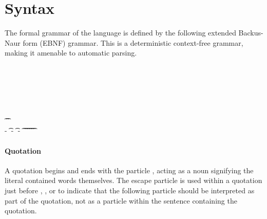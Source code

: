 \section{Syntax} \label{sec:syntax}

The formal grammar of the language is defined by the following extended
Backus-Naur form (EBNF) grammar. This is a deterministic context-free grammar,
making it amenable to automatic parsing.

\begin{ebnf}
	 \is {} 
	\\
	 \is {} 
	\altLine {}  
	\altLine {}  
	\\
	 \is {}
	\altLine {}
	\altLine {}
	\altLine {}
	\altLine {}  
	\\
	 \is {}  
	\\
	 \is {} \alt {}
	\altLine {}  
	\\
	 \is \t{}  \t{}
	\\
	 \is {} - \t{} - \t{} - \t{}
	\altLine \t{} \t{}
	\altLine \t{} \t{}
	\altLine \t{} \t{}
\end{ebnf}


\paragraph{Quotation} A quotation begins and ends with the particle ,
acting as a noun signifying the literal contained words themselves. The escape
particle  is used within a quotation just before ,
, or  to indicate that the following particle should be
interpreted as part of the quotation, not as a particle within the sentence
containing the quotation.

